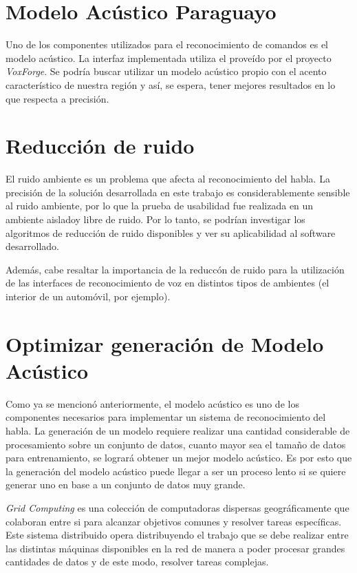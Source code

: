 \section{Modelo Ac\'ustico Paraguayo}  

Uno de los componentes utilizados para el reconocimiento de comandos es el modelo ac\'ustico. La interfaz implementada
utiliza el prove\'ido por el proyecto \emph{VoxForge}. Se podr\'ia buscar utilizar un modelo ac\'ustico propio con el
acento caracter\'istico de nuestra regi\'on y as\'i, se espera, tener mejores resultados en lo que respecta a precisi\'on.

\section{Reducci\'on de ruido}

El ruido ambiente es un problema que afecta al reconocimiento del habla. La precisi\'on de la
soluci\'on desarrollada en este trabajo es considerablemente sensible al ruido ambiente, por lo que 
la prueba de usabilidad fue realizada en un ambiente aisladoy libre de ruido. 
Por lo tanto, se podr\'ian investigar los algoritmos de reducci\'on de ruido disponibles y ver su aplicabilidad
al software desarrollado. 

Adem\'as, cabe resaltar la importancia de la reducc\'on de ruido para la utilizaci\'on de
las interfaces de reconocimiento de voz en distintos tipos de ambientes (el interior de un autom\'ovil, por ejemplo).

\section{Optimizar generaci\'on de Modelo Ac\'ustico}

Como ya se mencion\'o anteriormente, el modelo ac\'ustico es uno de los componentes necesarios para implementar un sistema de 
reconocimiento del habla. La generación de un modelo requiere realizar una cantidad considerable de procesamiento sobre
un conjunto de datos, cuanto mayor sea el tama\~no de datos para entrenamiento, se lograr\'a obtener un mejor modelo ac\'ustico. Es por
esto que la generaci\'on del modelo ac\'ustico puede llegar a ser un proceso lento si se quiere generar uno en base a un conjunto de datos
muy grande.

\emph{Grid Computing} es una colecci\'on de computadoras dispersas geogr\'aficamente que colaboran entre si para alcanzar objetivos comunes y resolver
tareas espec\'ificas. Este sistema distribuido opera distribuyendo el trabajo que se debe realizar entre las distintas m\'aquinas disponibles en la red
de manera a poder procesar grandes cantidades de datos y de este modo, resolver tareas complejas.

